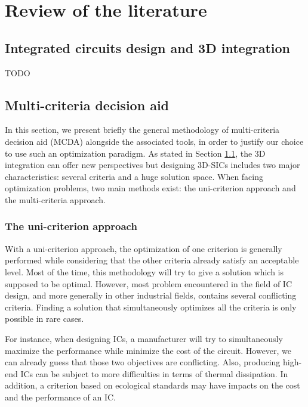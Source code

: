 \chapter{Review of the literature}
\label{cha:rol}

\section{Integrated circuits design and 3D integration}
\label{sec:rol.icdesign}
TODO

\section{Multi-criteria decision aid}
\label{sec:rol.mcda}

In this section, we present briefly the general methodology of multi-criteria decision aid (MCDA) alongside the associated tools, in order to justify our choice to use such an optimization paradigm. As stated in Section \ref{sec:rol.icdesign}, the 3D integration can offer new perspectives but designing 3D-SICs includes two major characteristics: several criteria and a huge solution space. When facing optimization problems, two main methods exist: the uni-criterion approach and the multi-criteria approach.

\subsection{The uni-criterion approach}
\label{subsec:rol.unicrit_approach}

With a uni-criterion approach, the optimization of one criterion is generally performed while considering that the other criteria already satisfy an acceptable level. Most of the time, this methodology will try to give a solution which is supposed to be optimal. However, most problem encountered in the field of IC design, and more generally in other industrial fields, contains several conflicting criteria. Finding a solution that simultaneously optimizes all the criteria is only possible in rare cases.

For instance, when designing ICs, a manufacturer will try to simultaneously maximize the performance while minimize the cost of the circuit. However, we can already guess that those two objectives are conflicting. Also, producing high-end ICs can be subject to more difficulties in terms of thermal dissipation. In addition, a criterion based on ecological standards may have impacts on the cost and the performance of an IC.

